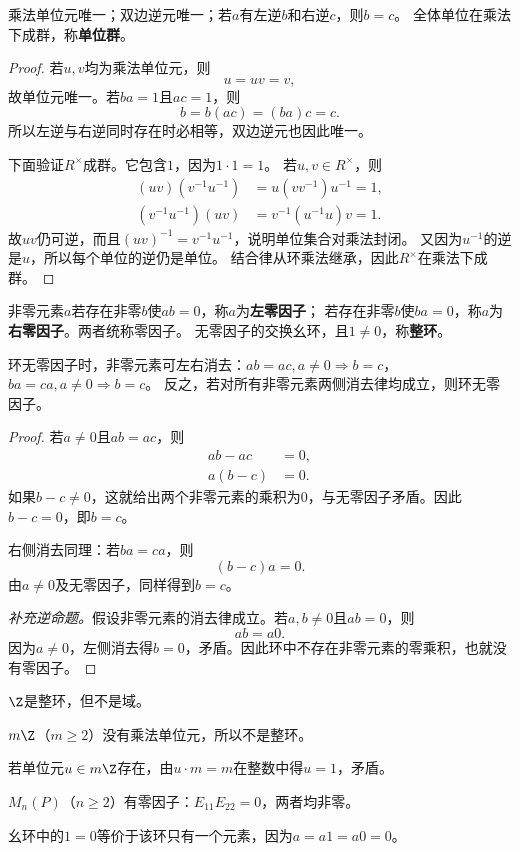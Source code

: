 \begin{proposition}
乘法单位元唯一；双边逆元唯一；若$a$有左逆$b$和右逆$c$，则$b=c$。
\label{p2:concept:c1-l963}全体单位在乘法下成群，称\textbf{单位群}。
\end{proposition}
\begin{proof}
若$u,v$均为乘法单位元，则
\[
u=uv=v,
\]
故单位元唯一。若$ba=1$且$ac=1$，则
\[b=b(ac)=(ba)c=c.\]
所以左逆与右逆同时存在时必相等，双边逆元也因此唯一。

下面验证$R^\times$成群。它包含$1$，因为$1\cdot1=1$。
若$u,v\in R^\times$，则
\[
\begin{aligned}
(uv)(v^{-1}u^{-1})&=u(vv^{-1})u^{-1}=1,\\
(v^{-1}u^{-1})(uv)&=v^{-1}(u^{-1}u)v=1.
\end{aligned}
\]
故$uv$仍可逆，而且$(uv)^{-1}=v^{-1}u^{-1}$，说明单位集合对乘法封闭。
又因为$u^{-1}$的逆是$u$，所以每个单位的逆仍是单位。
结合律从环乘法继承，因此$R^\times$在乘法下成群。
\end{proof}

\begin{definition}
\label{p2:concept:c1-l988}非零元素$a$若存在非零$b$使$ab=0$，称$a$为\textbf{左零因子}；
\label{p2:concept:c1-l989}若存在非零$b$使$ba=0$，称$a$为\textbf{右零因子}。两者统称零因子。
\label{p2:concept:c1-l990}无零因子的交换幺环，且$1\neq0$，称\textbf{整环}。
\end{definition}

\begin{proposition}
环无零因子时，非零元素可左右消去：$ab=ac,a\neq0\Rightarrow b=c$，$ba=ca,a\neq0\Rightarrow b=c$。
反之，若对所有非零元素两侧消去律均成立，则环无零因子。
\end{proposition}
\begin{proof}
若$a\neq0$且$ab=ac$，则
\[
\begin{aligned}
ab-ac&=0,\\
a(b-c)&=0.
\end{aligned}
\]
如果$b-c\neq0$，这就给出两个非零元素的乘积为0，与无零因子矛盾。因此$b-c=0$，即$b=c$。

右侧消去同理：若$ba=ca$，则
\[
(b-c)a=0.
\]
由$a\neq0$及无零因子，同样得到$b=c$。

\textit{补充逆命题。}假设非零元素的消去律成立。若$a,b\neq0$且$ab=0$，则
\[
ab=a0.
\]
因为$a\neq0$，左侧消去得$b=0$，矛盾。因此环中不存在非零元素的零乘积，也就没有零因子。
\end{proof}

\begin{example}

$\Z$是整环，但不是域。

$m\Z$（$m\geq2$）没有乘法单位元，所以不是整环。

若单位元$u\in m\Z$存在，由$u\cdot m=m$在整数中得$u=1$，矛盾。

$M_n(P)$（$n\geq2$）有零因子：$E_{11}E_{22}=0$，两者均非零。

幺环中的$1=0$等价于该环只有一个元素，因为$a=a1=a0=0$。
\end{example}

